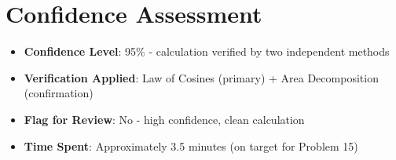 \documentclass[11pt]{article}
\begin{document}
\section*{Confidence Assessment}
\begin{itemize}[leftmargin=*]
    \item \textbf{Confidence Level}: 95\% - calculation verified by two independent methods
    \item \textbf{Verification Applied}: Law of Cosines (primary) + Area Decomposition (confirmation)
    \item \textbf{Flag for Review}: No - high confidence, clean calculation
    \item \textbf{Time Spent}: Approximately 3.5 minutes (on target for Problem 15)
\end{itemize}
\end{document}
